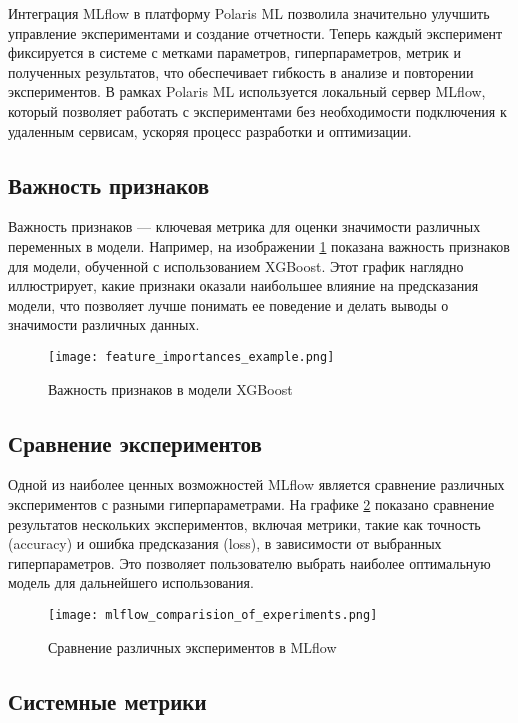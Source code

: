 Интеграция MLflow в платформу Polaris ML позволила значительно улучшить управление экспериментами и создание отчетности. Теперь каждый эксперимент фиксируется в системе с метками параметров, гиперпараметров, метрик и полученных результатов, что обеспечивает гибкость в анализе и повторении экспериментов. В рамках Polaris ML используется локальный сервер MLflow, который позволяет работать с экспериментами без необходимости подключения к удаленным сервисам, ускоряя процесс разработки и оптимизации.

\subsection{Важность признаков}

Важность признаков — ключевая метрика для оценки значимости различных переменных в модели. Например, на изображении \ref{fig:feature_importances} показана важность признаков для модели, обученной с использованием XGBoost. Этот график наглядно иллюстрирует, какие признаки оказали наибольшее влияние на предсказания модели, что позволяет лучше понимать ее поведение и делать выводы о значимости различных данных.

\begin{figure}[H]
	\centering
	\texttt{[image: feature\_importances\_example.png]}
	\caption{Важность признаков в модели XGBoost}
	\label{fig:feature_importances}
\end{figure}

\subsection{Сравнение экспериментов}

Одной из наиболее ценных возможностей MLflow является сравнение различных экспериментов с разными гиперпараметрами. На графике \ref{fig:mlflow_comparison} показано сравнение результатов нескольких экспериментов, включая метрики, такие как точность (accuracy) и ошибка предсказания (loss), в зависимости от выбранных гиперпараметров. Это позволяет пользователю выбрать наиболее оптимальную модель для дальнейшего использования.

\begin{figure}[H]
	\centering
	\texttt{[image: mlflow\_comparision\_of\_experiments.png]}
	\caption{Сравнение различных экспериментов в MLflow}
	\label{fig:mlflow_comparison}
\end{figure}

\subsection{Системные метрики}

